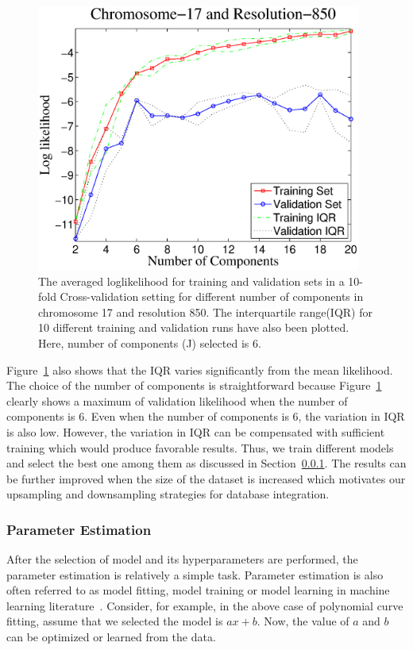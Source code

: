 \begin{figure}[h!]
\centering
\includegraphics[width=0.95\textwidth]{figures/chr17dm850lat}
\caption[Model selection in chromosome 17 and resolution 850]{The averaged loglikelihood for training and validation sets in a 10-fold Cross-validation setting for different number of components in chromosome 17 and resolution 850. The interquartile range(IQR) for 10 different training and validation runs have also been plotted. Here, number of components (J) selected is 6.} \label{Fig:chr17dm850}
\end{figure}

Figure~\ref{Fig:chr17dm850} also shows that the IQR varies significantly from the mean likelihood. The choice of the number of components is straightforward  because Figure~\ref{Fig:chr17dm850} clearly shows a maximum of validation likelihood when the number of components is 6. Even when the number of components is 6, the variation in IQR is also low. However, the variation in IQR can be compensated with sufficient training which would produce favorable results. Thus, we train different models and select the best one among them as discussed in Section~\ref{ss:parameterestimation}. The results can be further improved when the size of the dataset is increased which motivates our upsampling and downsampling strategies for database integration.

\subsubsection{Parameter Estimation}
\label{ss:parameterestimation}
After the selection of model and its hyperparameters are performed, the parameter estimation is relatively a simple task. Parameter estimation is also often referred to as model fitting, model training or model learning in machine learning literature~\cite{bishop, mitchell}. Consider, for example, in the above case of polynomial curve fitting, assume that we selected the model is $ax+b$. Now, the value of $a$ and $b$ can be optimized or learned from the data. 

